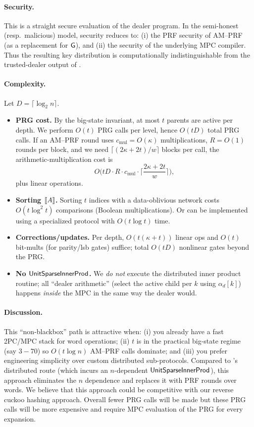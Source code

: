 \paragraph{Security.}
This is a straight secure evaluation of the dealer program. In the semi-honest (resp.\ malicious) model,
security reduces to: (i) the PRF security of AM--PRF (as a replacement for $\mathsf{G}$), and (ii) the security of the underlying MPC compiler.
Thus the resulting key distribution is computationally indistinguishable from the trusted-dealer output of \cite{dmpf}.

\paragraph{Complexity.}
Let $D=\lceil\log_2 n\rceil$.
\begin{itemize}
  \item \textbf{PRG cost.} By the big-state invariant, at most $t$ parents are active per depth.
  We perform $O(t)$ PRG calls per level, hence $O(tD)$ total PRG calls. If an AM--PRF round uses $c_{\mathrm{mul}}=O(\kappa)$ multiplications, $R=O(1)$ rounds per block, and we need $\lceil(2\kappa+2t)/w\rceil$ blocks per call, the arithmetic-multiplication cost is
  \[
    O\!\Big(tD \cdot R \cdot c_{\mathrm{mul}} \cdot \Big\lceil\frac{2\kappa+2t}{w}\Big\rceil\Big),
  \]
  plus linear operations. 
  \item \textbf{Sorting $\share{A}$.} Sorting $t$ indices with a data-oblivious network costs $O(t\log^2 t)$ comparisons (Boolean multiplications). Or can be implemented using a specialized protocol with $O(t \log t)$ time\cite{permCor,sort}.
  \item \textbf{Corrections/updates.} Per depth, $O(t(\kappa+t))$ linear ops and $O(t)$ bit-mults (for parity/lsb gates) suffice; total $O(tD)$ nonlinear gates beyond the PRG.
  \item \textbf{No $\mathsf{UnitSparseInnerProd}$.} We \emph{do not} execute the distributed inner product routine; all “dealer arithmetic” (select the active child per $k$ using $\alpha_d[k]$) happens \emph{inside} the MPC in the same way the dealer would.
\end{itemize}

\paragraph{Discussion.}
This “non-blackbox” path is attractive when:
(i) you already have a fast 2PC/MPC stack for word operations;
(ii) $t$ is in the practical big-state regime (say $3\!-\!70$) so $O(t\log n)$ AM--PRF calls dominate; and
(iii) you prefer engineering simplicity over custom distributed sub-protocols.
Compared to \cite{dmpf}’s distributed route (which incurs an $n$-dependent $\mathsf{UnitSparseInnerProd}$), this approach eliminates the $n$ dependence and replaces it with PRF rounds over words. We believe that this approach could be competitive with our reverse cuckoo hashing approach. Overall fewer PRG calls will be made but these PRG calls will be more expensive and require MPC evaluation of the PRG for every expansion.
